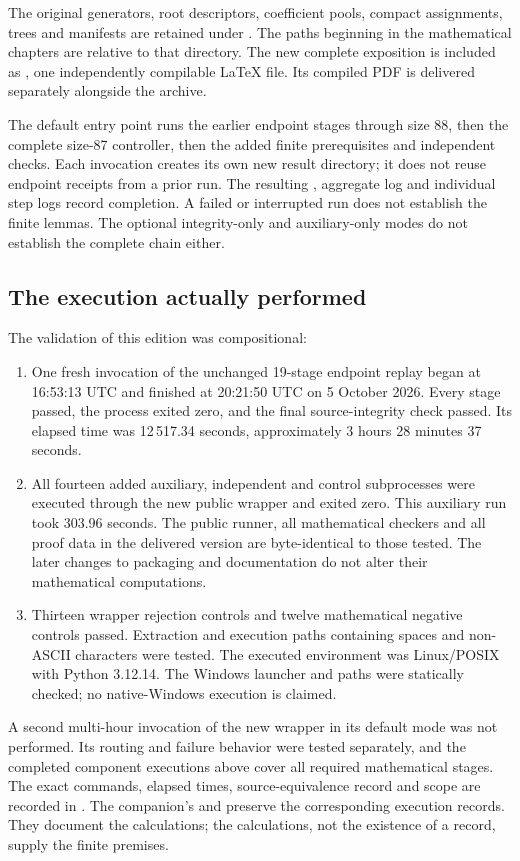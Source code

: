 \documentclass[11pt,a4paper]{article}
\theoremstyle{remark}
\begin{document}
The original generators, root descriptors, coefficient pools, compact
assignments, trees and manifests are retained under
. The paths beginning
 in the mathematical chapters are relative to that directory.
The new complete exposition is included as
, one independently compilable
\LaTeX{} file. Its compiled PDF is delivered separately alongside the archive.

The default entry point runs the earlier endpoint stages through size 88,
then the complete size-87 controller, then the added finite prerequisites
and independent checks. Each invocation creates its own new result
directory; it does not reuse endpoint receipts from a prior run.
The resulting , aggregate log and individual step logs
record completion. A failed or interrupted run does not establish the
finite lemmas. The optional integrity-only and auxiliary-only modes do
not establish the complete chain either.

\subsection{The execution actually performed}
The validation of this edition was compositional:
\begin{enumerate}
\item One fresh invocation of the unchanged 19-stage endpoint replay
began at 16:53:13 UTC and finished at 20:21:50 UTC on 5 October 2026.
Every stage passed, the process exited zero, and the final source-integrity
check passed. Its elapsed time was 12\,517.34 seconds, approximately
3 hours 28 minutes 37 seconds.
\item All fourteen added auxiliary, independent and control subprocesses
were executed through the new public wrapper and exited zero. This
auxiliary run took 303.96 seconds. The public runner, all mathematical
checkers and all proof data in the delivered version are byte-identical
to those tested. The later changes to packaging and documentation do not
alter their mathematical computations.
\item Thirteen wrapper rejection controls and twelve mathematical
negative controls passed. Extraction and execution paths containing
spaces and non-ASCII characters were tested. The executed environment
was Linux/POSIX with Python 3.12.14. The Windows launcher and paths were
statically checked; no native-Windows execution is claimed.
\end{enumerate}
A second multi-hour invocation of the new wrapper in its default mode
was not performed. Its routing and failure behavior were tested
separately, and the completed component executions above cover all
required mathematical stages. The exact commands, elapsed times,
source-equivalence record and scope are recorded in
. The companion's
 and
 preserve the corresponding
execution records. They document the calculations; the calculations,
not the existence of a record, supply the finite premises.
\end{document}
